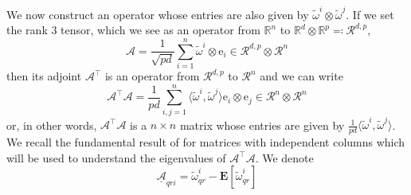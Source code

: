 \documentclass[letterpaper, 10pt, dvipsnames]{article}
\numberwithin{equation}{section}
\newcommand{\Rbb}{\mathbb{R}}
\newcommand{\e}{\mathrm{e}}
\newcommand{\A}{\mathcal{A}}
\newcommand{\R}{\mathcal{R}}
\newcommand{\wt}{\widetilde}
\theoremstyle{definition}
\begin{document}
We now construct an operator whose entries are also given by $\wt{\omega}^i\otimes \wt{\omega}^j$. If we set the rank 3 tensor, which we see as an operator from $\Rbb^n$ to $\Rbb^d\otimes \Rbb^p\eqqcolon \R^{d,p}$,
\[
\mathcal{A} = \frac{1}{\sqrt{pd}}\sum_{i=1}^n \wt{\omega}^i \otimes \e_i \in \R^{d,p}\otimes \R^n  
\]
then its adjoint $\mathcal{A}^\top$ is an operator from $\R^{d,p}$ to $\R^n$ and we can write
\[
\mathcal{A}^\top \mathcal{A} = 
\frac{1}{pd}\sum_{i,j=1}^n \langle \wt{\omega}^i,\wt{\omega}^j\rangle \e_i\otimes \e_j \in \R^n\otimes \R^n
\]
or, in other words, $\mathcal{A}^\top\mathcal{A}$ is a $n\times n$ matrix whose entries are given by $\frac{1}{pd}\langle \wt{\omega}^i, \wt{\omega}^j\rangle$. We recall the fundamental result of \cite{baizhou} for matrices with independent columns which will be used to understand the eigenvalues of $\A^\top \A$. We denote 
\[
\underline{\A}_{qri} =  \wt{\omega}^i_{qr}-\mathbf{E}[\wt{\omega}^i_{qr}]
\]
\end{document}
